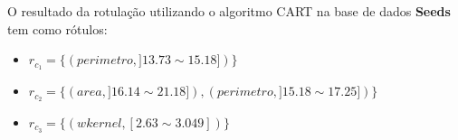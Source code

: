 %  
%     
%     
%  

O resultado da rotulação utilizando o algoritmo CART na base de dados \textbf{Seeds} tem como rótulos: 
\begin{itemize}[noitemsep]
 \item ${r_{c_1}=\{ (perimetro, ]13.73 \sim 15.18]) \} }$
 \item ${r_{c_2}=\{ (area, ]16.14 \sim 21.18]), (perimetro, ]15.18 \sim 17.25]) \} }$
 \item ${r_{c_3}=\{ (wkernel, [2.63 \sim 3.049]) \} }$
\end{itemize}


